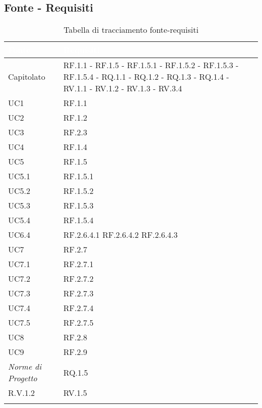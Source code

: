 \subsection{Fonte - Requisiti}
\begin{center}
  \centering
  \begin{longtable}{|C{6cm}|C{6cm}|}
    \hline
    \textcolor[HTML]{FFFFFF}{\textbf{Fonte}} & \textcolor[HTML]{FFFFFF}{\textbf{Requisiti}} \\ \hline
    Capitolato & RF.1.1 - RF.1.5 - RF.1.5.1 - RF.1.5.2 - RF.1.5.3 - RF.1.5.4 - RQ.1.1 - RQ.1.2 - RQ.1.3 - RQ.1.4 - RV.1.1 - RV.1.2 - RV.1.3 - RV.3.4 \\ \hline
    UC1 & RF.1.1 \\ \hline
    UC2 & RF.1.2 \\ \hline
    UC3 & RF.2.3 \\ \hline
    UC4 & RF.1.4 \\ \hline
    UC5 & RF.1.5 \\ \hline
    UC5.1 & RF.1.5.1 \\ \hline
    UC5.2 & RF.1.5.2 \\ \hline
    UC5.3 & RF.1.5.3 \\ \hline
    UC5.4 & RF.1.5.4 \\ \hline
    UC6.4 & RF.2.6.4.1 RF.2.6.4.2 RF.2.6.4.3  \\ \hline
    UC7 & RF.2.7 \\ \hline
    UC7.1 & RF.2.7.1 \\ \hline
    UC7.2 & RF.2.7.2 \\ \hline
    UC7.3 & RF.2.7.3 \\ \hline
    UC7.4 & RF.2.7.4 \\ \hline
    UC7.5 & RF.2.7.5 \\ \hline
    UC8 & RF.2.8 \\ \hline
    UC9 & RF.2.9 \\ \hline
    \textit{Norme di Progetto} & RQ.1.5 \\ \hline
    R.V.1.2 & RV.1.5 \\ \hline

    \caption{Tabella di tracciamento fonte-requisiti}
  \end{longtable}
\end{center}


